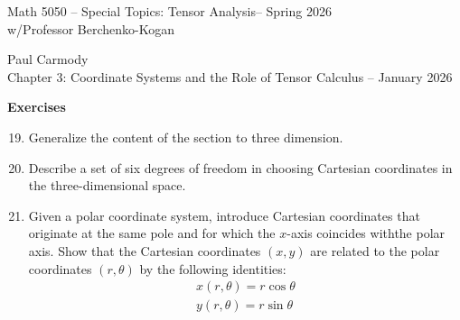 \documentclass[12pt,a4paper]{report}
\newcommand{\CLASSNAME}{Math 5050 -- Special Topics: Tensor Analysis}
\newcommand{\STUDENTNAME}{Paul Carmody}
\newcommand{\ASSIGNMENT}{Chapter 3: Coordinate Systems and the Role of Tensor Calculus }
\newcommand{\DUEDATE}{January 2026}
\newcommand{\PROFESSOR}{Professor Berchenko-Kogan}
\newcommand{\SEMESTER}{Spring 2026}
\begin{document}
\begin{center}
	\Large{\CLASSNAME -- \SEMESTER} \\
	\large{ w/\PROFESSOR}
\end{center}
\begin{center}
	\STUDENTNAME \\
	\ASSIGNMENT -- \DUEDATE\\
\end{center} 

\textbf{Exercises}
\begin{enumerate}[label=\textbf{\arabic*.}]
\setcounter{enumi}{18}
\item Generalize the content of the section to three dimension.

\item Describe a set of six degrees of freedom in choosing Cartesian coordinates in the three-dimensional space.

\item Given a polar coordinate system, introduce Cartesian coordinates that originate at the same pole and for which the $x$-axis coincides withthe polar axis.  Show that the Cartesian coordinates $(x,y)$ are related to the polar coordinates $(r,\theta)$ by the following identities:
\begin{align*}
	x(r,\theta) = r\cos \theta \\
	y(r,\theta) = r\sin \theta
\end{align*} 
\begin{center}

\end{center}
\end{enumerate}
\end{document}
